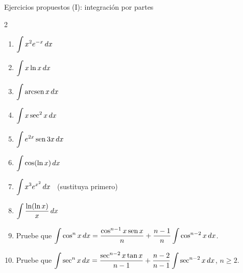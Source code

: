 \documentclass[10pt,aspectratio=169]{beamer}
\begin{document}
\begin{frame}{Ejercicios propuestos (I): integración por partes}
  \begin{ejercicio}
    \begin{multicols}{2}
    \begin{enumerate}
      \item $\displaystyle\int x^2e^{-x}\,dx$
      \item $\displaystyle\int x\ln x\,dx$
      \item $\displaystyle\int\operatorname{arcsen} x\,dx$
      \item $\displaystyle\int x\sec^2x\,dx$
      \item $\displaystyle\int e^{2x}\operatorname{sen}3x\,dx$
      \item $\displaystyle\int\cos(\ln x)\,dx$
      \item $\displaystyle\int x^3e^{x^2}\,dx$ \ \small(sustituya primero)
      \item $\displaystyle\int\frac{\ln(\ln x)}{x}\,dx$
    \end{enumerate}
    \end{multicols}
  \end{ejercicio}
  \begin{ejercicio}[: reducción]
    \begin{enumerate}
      \setcounter{enumi}{8}
      \item Pruebe que $\displaystyle\int\cos^nx\,dx=\frac{\cos^{n-1}x\operatorname{sen} x}{n}+\frac{n-1}{n}\int\cos^{n-2}x\,dx$.
      \item Pruebe que $\displaystyle\int\sec^nx\,dx=\frac{\sec^{n-2}x\tan x}{n-1}+\frac{n-2}{n-1}\int\sec^{n-2}x\,dx$, $n\ge2$.
    \end{enumerate}
  \end{ejercicio}
\end{frame}
\end{document}
